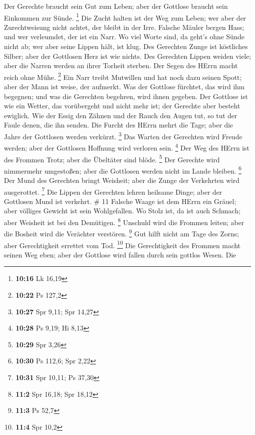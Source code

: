 Der Gerechte braucht sein Gut zum Leben; aber der Gottlose braucht sein
Einkommen zur Sünde. \footnote{\textbf{10:16} Lk 16,19} 
Die Zucht halten ist der Weg zum Leben; wer aber der Zurechtweisung
nicht achtet, der bleibt in der Irre.  Falsche Mäuler
bergen Hass; und wer verleumdet, der ist ein Narr.  Wo viel
Worte sind, da geht's ohne Sünde nicht ab; wer aber seine Lippen hält,
ist klug.  Des Gerechten Zunge ist köstliches Silber; aber
der Gottlosen Herz ist wie nichts.  Des Gerechten Lippen
weiden viele; aber die Narren werden an ihrer Torheit sterben.
 Der Segen des HErrn macht reich ohne Mühe. \footnote{\textbf{10:22}
  Ps 127,2}  Ein Narr treibt Mutwillen und hat noch dazu
seinen Spott; aber der Mann ist weise, der aufmerkt.  Was
der Gottlose fürchtet, das wird ihm begegnen; und was die Gerechten
begehren, wird ihnen gegeben.  Der Gottlose ist wie ein
Wetter, das vorübergeht und nicht mehr ist; der Gerechte aber besteht
ewiglich.  Wie der Essig den Zähnen und der Rauch den Augen
tut, so tut der Faule denen, die ihn senden.  Die Furcht
des HErrn mehrt die Tage; aber die Jahre der Gottlosen werden verkürzt.
\footnote{\textbf{10:27} Spr 9,11; Spr 14,27}  Das Warten
der Gerechten wird Freude werden; aber der Gottlosen Hoffnung wird
verloren sein. \footnote{\textbf{10:28} Ps 9,19; Hi 8,13} 
Der Weg des HErrn ist des Frommen Trotz; aber die Übeltäter sind blöde.
\footnote{\textbf{10:29} Spr 3,26}  Der Gerechte wird
nimmermehr umgestoßen; aber die Gottlosen werden nicht im Lande bleiben.
\footnote{\textbf{10:30} Ps 112,6; Spr 2,22}  Der Mund des
Gerechten bringt Weisheit; aber die Zunge der Verkehrten wird
ausgerottet. \footnote{\textbf{10:31} Spr 10,11; Ps 37,30} 
Die Lippen der Gerechten lehren heilsame Dinge; aber der Gottlosen Mund
ist verkehrt. \# 11  Falsche Waage ist dem HErrn ein Gräuel;
aber völliges Gewicht ist sein Wohlgefallen.  Wo Stolz ist,
da ist auch Schmach; aber Weisheit ist bei den Demütigen. \footnote{\textbf{11:2}
  Spr 16,18; Spr 18,12}  Unschuld wird die Frommen leiten;
aber die Bosheit wird die Verächter verstören. \footnote{\textbf{11:3}
  Ps 52,7}  Gut hilft nicht am Tage des Zorns; aber
Gerechtigkeit errettet vom Tod. \footnote{\textbf{11:4} Spr 10,2}
 Die Gerechtigkeit des Frommen macht seinen Weg eben; aber
der Gottlose wird fallen durch sein gottlos Wesen.  Die
